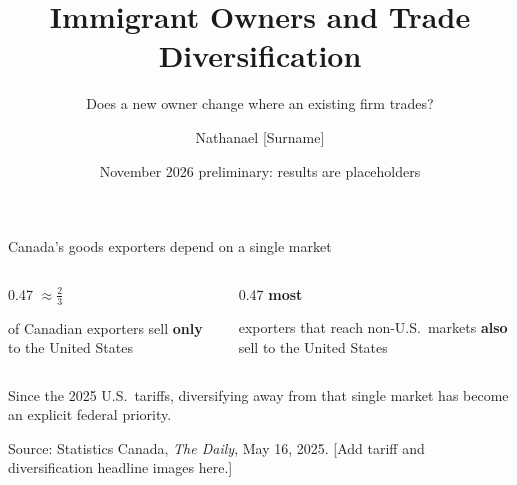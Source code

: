 \documentclass[11pt,aspectratio=169,notes]{beamer}
\title{Immigrant Owners and Trade Diversification}
\subtitle{Does a new owner change where an existing firm trades?}
\author{Nathanael [Surname]}
\institute{[Department, University]}
\date{November 2026 \quad\textbar\quad preliminary: results are placeholders}
\newcommand{\src}[1]{\par\vfill{\color{mute}\scriptsize #1\par}}
\begin{document}
\begin{frame}[plain]
\titlepage
\end{frame}

\begin{frame}{Canada's goods exporters depend on a single market}
\vspace{0.4cm}
\begin{columns}[T]
\begin{column}{0.47\textwidth}
  {\fontsize{40}{40}\selectfont\bfseries\color{accent}$\approx\tfrac{2}{3}$}\par\vspace{0.25cm}
  of Canadian exporters sell \textbf{only} to the United States
\end{column}
\begin{column}{0.47\textwidth}
  {\fontsize{40}{40}\selectfont\bfseries\color{accent}most}\par\vspace{0.25cm}
  exporters that reach non-U.S.\ markets \textbf{also} sell to the United States
\end{column}
\end{columns}
\vspace{0.7cm}
\begin{keybox}
Since the 2025 U.S.\ tariffs, diversifying away from that single market has become an explicit federal priority.
\end{keybox}
\src{Source: Statistics Canada, \textit{The Daily}, May 16, 2025. [Add tariff and diversification headline images here.]}
\end{frame}
\end{document}
